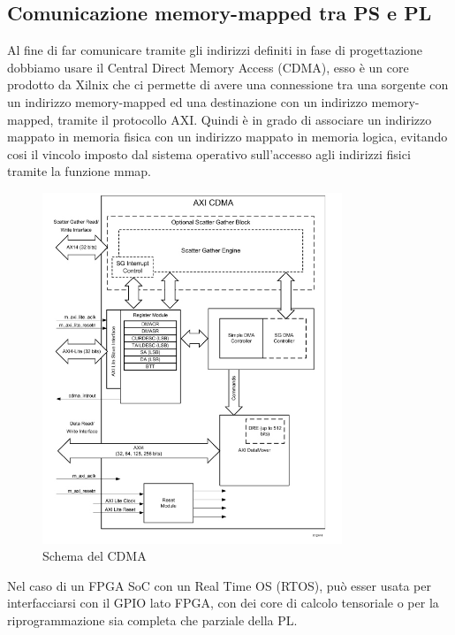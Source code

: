 \subsection{Comunicazione memory-mapped tra PS e PL}
Al fine di far comunicare tramite gli indirizzi definiti in fase di progettazione dobbiamo usare il Central Direct Memory Access (CDMA), esso è un core prodotto da Xilnix che ci permette di avere una connessione tra una sorgente con un indirizzo memory-mapped  ed una destinazione con un indirizzo memory-mapped, tramite il protocollo AXI. Quindi è in grado di associare un indirizzo mappato in memoria fisica con un indirizzo mappato in memoria logica, evitando cosi il vincolo imposto dal sistema operativo sull'accesso agli indirizzi fisici tramite la funzione mmap. \clearpage
\begin{figure}
    \centering
    \includegraphics[width=0.8\textwidth]{images/AXI6.jpg}
    \caption{Schema del CDMA}
    \label{fig:my_label}
\end{figure}

Nel caso di un FPGA SoC con un Real Time OS (RTOS), può esser usata per interfacciarsi con il GPIO lato FPGA, con dei core di calcolo tensoriale o per la riprogrammazione sia completa che parziale della PL.
